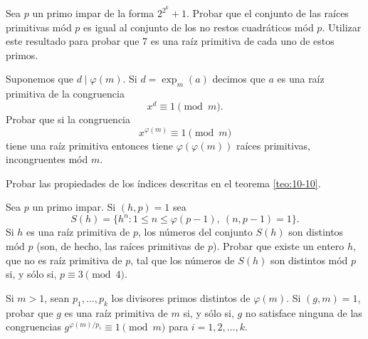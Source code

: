 \documentclass[12pt,a4paper]{book}
\begin{document}
    \begin{ejercicio}
        Sea $p$ un primo impar de la forma $2^{2^{k}}+1$. Probar que el conjunto de las raíces
        primitivas mód $p$ es igual al conjunto de los no restos cuadráticos mód $p$.
        Utilizar este resultado para probar que 7 es una raíz primitiva de cada uno de estos
        primos.
    \end{ejercicio}

    \begin{ejercicio}
        Suponemos que $d\mid\varphi(m)$. Si $d=\exp_{m}(a)$ decimos que $a$ es una raíz
        primitiva de la congruencia
        \begin{equation*}
            x^{d}\equiv1\pmod{m}.
        \end{equation*}
        Probar que si la congruencia
        \begin{equation*}
            x^{\varphi(m)}\equiv1\pmod{m}
        \end{equation*}
        tiene una raíz primitiva entonces tiene $\varphi(\varphi(m))$ raíces primitivas,
        incongruentes mód $m$.
    \end{ejercicio}

    \begin{ejercicio}
        Probar las propiedades de los índices descritas en el teorema \ref{teo:10-10}.
    \end{ejercicio}

    \begin{ejercicio}
        Sea $p$ un primo impar. Si $(h,p)=1$ sea
        \begin{equation*}
            S(h)=\{h^{n}:1\leq n\leq\varphi(p-1),\ (n,p-1)=1\}.
        \end{equation*}
        Si $h$ es una raíz primitiva de $p$, los números del conjunto $S(h)$ son distintos
        mód $p$ (son, de hecho, las raíces primitivas de $p$). Probar que existe un entero
        $h$, que no es raíz primitiva de $p$, tal que los números de $S(h)$ son distintos
        mód $p$ si, y sólo si, $p\equiv3\pmod{4}$.
    \end{ejercicio}

    \begin{ejercicio}
        Si $m>1$, sean $p_{1},\dots,p_{k}$ los divisores primos distintos de $\varphi(m)$. Si
        $(g,m)=1$, probar que $g$ es una raíz primitiva de $m$ si, y sólo si, $g$ no
        satisface ninguna de las congruencias $g^{\varphi(m)/p_{i}}\equiv1\pmod{m}$ para
        $i=1,2,\dots,k$.
    \end{ejercicio}
\end{document}
